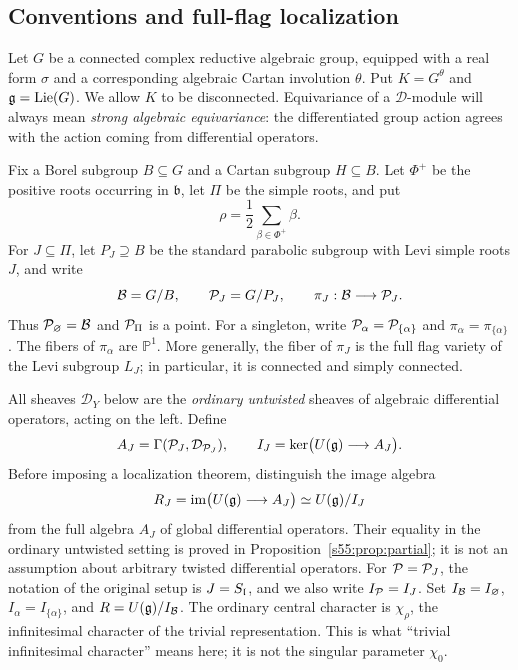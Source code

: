 \label{s55:section}

\subsection{Conventions and full-flag localization}

Let $G$ be a connected complex reductive algebraic group, equipped with a
real form $\sigma$ and a corresponding algebraic Cartan involution $\theta$.
Put $K=G^\theta$ and $\mathfrak{g}=\operatorname{Lie}(G)$. We allow $K$ to be
disconnected. Equivariance of a $\mathcal D$-module will always mean
\emph{strong algebraic equivariance}: the differentiated group action agrees
with the action coming from differential operators.

Fix a Borel subgroup $B\subseteq G$ and a Cartan subgroup $H\subseteq B$.
Let $\Phi^+$ be the positive roots occurring in $\mathfrak b$, let $\Pi$ be
the simple roots, and put
\[
  \rho=\frac12\sum_{\beta\in\Phi^+}\beta.
\]
For $J\subseteq\Pi$, let $P_J\supseteq B$ be the standard parabolic subgroup
with Levi simple roots $J$, and write
\[
  \mathcal{B}=G/B,\qquad \mathcal{P}_J=G/P_J,\qquad
  \pi_J:\mathcal{B}\longrightarrow\mathcal{P}_J.
\]
Thus $\mathcal{P}_\varnothing=\mathcal{B}$ and $\mathcal{P}_\Pi$ is a point. For a singleton, write
$\mathcal{P}_\alpha=\mathcal{P}_{\{\alpha\}}$ and $\pi_\alpha=\pi_{\{\alpha\}}$.
The fibers of $\pi_\alpha$ are $\mathbb P^1$. More generally, the fiber of
$\pi_J$ is the full flag variety of the Levi subgroup $L_J$; in particular,
it is connected and simply connected.

All sheaves $\mathcal D_Y$ below are the \emph{ordinary untwisted} sheaves
of algebraic differential operators, acting on the left. Define
\[
  A_J=\Gamma(\mathcal{P}_J,\mathcal D_{\mathcal{P}_J}),\qquad
  I_J=\ker\bigl(U(\mathfrak{g})\longrightarrow A_J\bigr).
\]
Before imposing a localization theorem, distinguish the image algebra
\[
 R_J=\operatorname{im}\bigl(U(\mathfrak{g})\longrightarrow A_J\bigr)
     \simeq U(\mathfrak{g})/I_J
\]
from the full algebra $A_J$ of global differential operators. Their equality
in the ordinary untwisted setting is proved in
Proposition~\ref{s55:prop:partial}; it is not an assumption about arbitrary
twisted differential operators.
For $\mathcal{P}=\mathcal{P}_J$, the notation of the original setup is $J=S_{\mathfrak{l}}$, and we also write $I_{\mathcal{P}}=I_J$. Set
$I_{\mathcal{B}}=I_\varnothing$, $I_\alpha=I_{\{\alpha\}}$, and
$R=U(\mathfrak{g})/I_{\mathcal{B}}$. The ordinary central character is $\chi_\rho$, the
infinitesimal character of the trivial representation. This is what
``trivial infinitesimal character'' means here; it is not the singular
parameter $\chi_0$.

